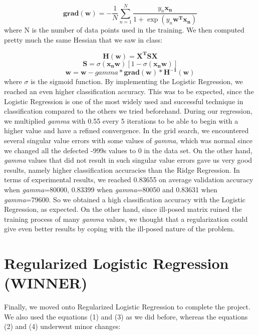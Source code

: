 \documentclass[journal]{IEEEtran}
\begin{document}
\begin{equation}
\mathbf{grad(w)}=-\dfrac{1}{N}\sum_{n=1}^{N} \dfrac{y_{n}\mathbf{x_{n}}}{1+\exp(y_{n}\mathbf{w^{T}}\mathbf{x_{n}})}
\end{equation}
where N is the number of data points used in the training. We then computed pretty much the same Hessian that we saw in class:

\begin{equation}
\mathbf{H(w)=X^{T}SX} 
\end{equation}
\begin{equation}
\mathbf{S}=\sigma(\mathbf{x_{n}w})[1-\sigma(\mathbf{x_{n}w})]
\end{equation}
\begin{equation}
\mathbf{w}=\mathbf{w}-gamma*\mathbf{grad(w)}*\mathbf{H^{-1}(w)}
\end{equation}
where  $\sigma$ is the sigmoid function. By implementing the Logistic Regression, we reached an even higher classification accuracy. This was to be expected, since the Logistic Regression is one of the most widely used and successful technique in classification compared to the others we tried beforehand. During our regression, we multiplied \textit{gamma} with 0.55 every 5 iterations to be able to begin with a higher value and have a refined convergence. In the grid search, we encountered several singular value errors with some values of \textit{gamma}, which was normal since we changed all the defected -999s values to 0 in the data set. On the other hand, \textit{gamma} values that did not result in such singular value errors gave us very good results, namely higher classification accuracies than the Ridge Regression. In terms of experimental results, we reached 0.83655 on average validation accuracy when \textit{gamma}=80000, 0.83399 when \textit{gamma}=80050 and 0.83631 when \textit{gamma}=79600. So we obtained a high classification accuracy with the Logistic Regression, as expected. On the other hand, since ill-posed matrix ruined the training process of many \textit{gamma} values, we thought that a regularization could give even better results by coping with the ill-posed nature of the problem.


\section{Regularized Logistic Regression (WINNER)}

Finally, we moved onto Regularized Logistic Regression to complete the project. We also used the equations (1) and (3) as we did before, whereas the equations (2) and (4) underwent minor changes:
\end{document}
